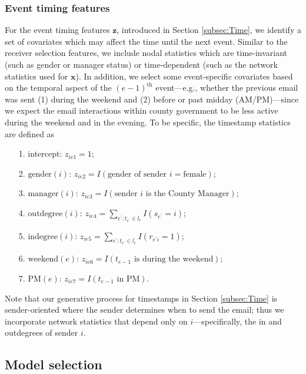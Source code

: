 \documentclass[ba]{imsart}
\numberwithin{equation}{section}
\theoremstyle{plain}
\begin{document}
	\subsubsection{Event timing features}
For the event timing features $\boldsymbol{z}$, introduced in Section \ref{subsec:Time}, we identify a set of covariates which may affect the time until the next event. Similar to the receiver selection features, we include nodal statistics which are time-invariant (such as gender or manager status) or time-dependent (such as the network statistics used for $\boldsymbol{x}$). In addition, we select some event-specific covariates based on the temporal aspect of the $(e-1)^{\textrm{th}}$ event---e.g., whether the previous email was sent (1) during the weekend and (2) before or past midday (AM/PM)---since we expect the email interactions within county government to be less active during the weekend and in the evening. To be specific, the timestamp statistics are defined as
	\begin{itemize}
		\item[1.] intercept: ${z}_{ie1} =1$;
		\item[2.] $\mbox{gender}(i)$: ${z}_{ie2}=I(\mbox{gender of sender }i= \mbox{female})$;
		\item[3.] $\mbox{manager}(i)$: ${z}_{ie3}=I(\mbox{sender }i \mbox{ is the County Manager})$;
		\item[4.] $\mbox{outdegree}(i)$: ${z}_{ie4} =\sum_{e^\prime: t_{e^\prime} \in l_e} I(s_{e^\prime} = i)$;
		\item[5.] $\mbox{indegree}(i)$: ${z}_{ie5}=\sum_{e^\prime: t_{e^\prime} \in l_e} I(r_{e^\prime i} = 1)$;
		\item[6.] $\mbox{weekend}(e)$: ${z}_{ie6} = I(t_{e-1} \mbox{ is during the } \mbox{weekend})$;
		\item[7.] $\mbox{PM}(e)$: ${z}_{ie7}= I(t_{e-1} \mbox{ in } \mbox{PM})$.
	\end{itemize}
	Note that our generative process for timestamps in Section \ref{subsec:Time} is sender-oriented where the sender determines when to send the email; thus we incorporate network statistics that depend only on $i$---specifically, the in and outdegrees of sender $i$. 
	
	\subsection{Model selection}\label{subsec:Experiment_email}
	
\end{document}

